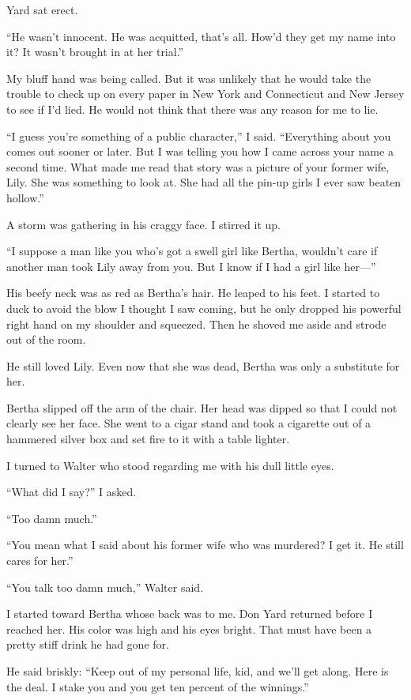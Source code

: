 \documentclass{novel}
\begin{document}
Yard sat erect.

“He wasn’t innocent. He was acquitted, that’s all. How’d they get my name into it? It wasn’t brought in at her trial.”

My bluff hand was being called. But it was unlikely that he would take the trouble to check up on every paper in New York and Connecticut and New Jersey to see if I’d lied. He would not think that there was any reason for me to lie.

“I guess you’re something of a public character,” I said. “Everything about you comes out sooner or later. But I was telling you how I came across your name a second time. What made me read that story was a picture of your former wife, Lily. She was something to look at. She had all the pin-up girls I ever saw beaten hollow.” 

A storm was gathering in his craggy face. I stirred it up. 

“I suppose a man like you who’s got a swell girl like Bertha, wouldn’t care if another man took Lily away from you. But I know if I had a girl like her—”

His beefy neck was as red as Bertha’s hair. He leaped to his feet. I started to duck to avoid the blow I thought I saw coming, but he only dropped his powerful right hand on my shoulder and squeezed. Then he shoved me aside and strode out of the room.

He still loved Lily. Even now that she was dead, Bertha was only a substitute for her.

Bertha slipped off the arm of the chair. Her head was dipped so that I could not clearly see her face. She went to a cigar stand and took a cigarette out of a hammered silver box and set fire to it with a table lighter.

I turned to Walter who stood regarding me with his dull little eyes. 

“What did I say?” I asked.

“Too damn much.”

“You mean what I said about his former wife who was murdered? I get it. He still cares for her.”

“You talk too damn much,” Walter said.

\scenestars

I started toward Bertha whose back was to me. Don Yard returned before I reached her. His color was high and his eyes bright. That must have been a pretty stiff drink he had gone for.

He said briskly: “Keep out of my personal life, kid, and we’ll get along. Here is the deal. I stake you and you get ten percent of the winnings.”
\end{document}
